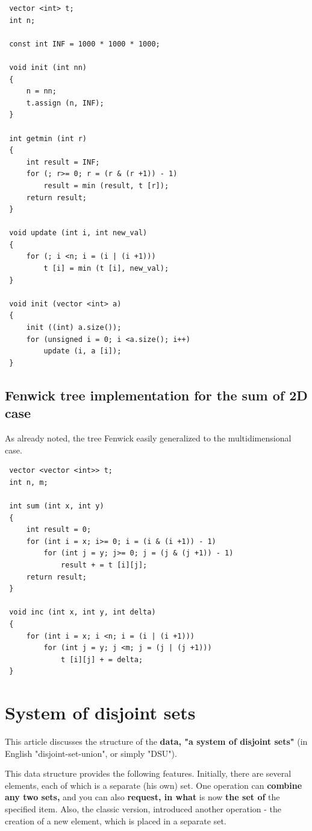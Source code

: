 \begin{verbatim}
 vector <int> t;
 int n;

 const int INF = 1000 * 1000 * 1000;

 void init (int nn)
 {
     n = nn;
     t.assign (n, INF);
 }

 int getmin (int r)
 {
     int result = INF;
     for (; r>= 0; r = (r & (r +1)) - 1)
         result = min (result, t [r]);
     return result;
 }

 void update (int i, int new_val)
 {
     for (; i <n; i = (i | (i +1)))
         t [i] = min (t [i], new_val);
 }

 void init (vector <int> a)
 {
     init ((int) a.size());
     for (unsigned i = 0; i <a.size(); i++)
         update (i, a [i]);
 } 
\end{verbatim}
\subsection{ Fenwick tree implementation for the sum of 2D case }
As already noted, the tree Fenwick easily generalized to the multidimensional case.

\begin{verbatim}
 vector <vector <int>> t;
 int n, m;

 int sum (int x, int y)
 {
     int result = 0;
     for (int i = x; i>= 0; i = (i & (i +1)) - 1)
         for (int j = y; j>= 0; j = (j & (j +1)) - 1)
             result + = t [i][j];
     return result;
 }

 void inc (int x, int y, int delta)
 {
     for (int i = x; i <n; i = (i | (i +1)))
         for (int j = y; j <m; j = (j | (j +1)))
             t [i][j] + = delta;
 } 
\end{verbatim}
\section{ System of disjoint sets }
This article discusses the structure of the \textbf{data, "a system of disjoint sets"} (in English "disjoint-set-union", or simply "DSU").

This data structure provides the following features. Initially, there are several elements, each of which is a separate (his own) set. One operation can \textbf{combine any two sets,} and you can also \textbf{request, in what} is now \textbf{the set of} the specified item. Also, the classic version, introduced another operation - the creation of a new element, which is placed in a separate set.

